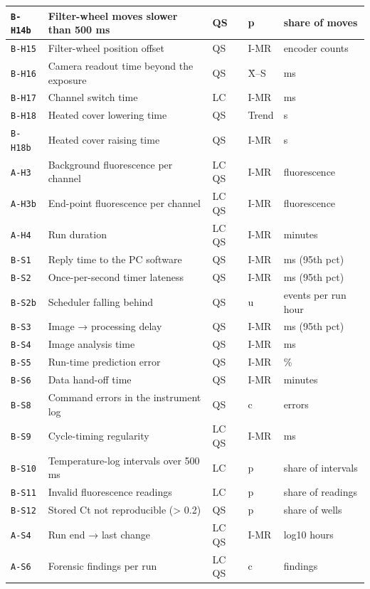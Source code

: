 {\begin{longtable}{@{}lllll@{}}
\texttt{B-H14b} & Filter-wheel moves slower than 500 ms & QS & p & share of moves \\\hline
\texttt{B-H15} & Filter-wheel position offset & QS & I-MR & encoder counts \\\hline
\texttt{B-H16} & Camera readout time beyond the exposure & QS & X̄–S & ms \\\hline
\texttt{B-H17} & Channel switch time & LC & I-MR & ms \\\hline
\texttt{B-H18} & Heated cover lowering time & QS & Trend & s \\\hline
\texttt{B-H18b} & Heated cover raising time & QS & I-MR & s \\\hline
\texttt{A-H3} & Background fluorescence per channel & LC QS & I-MR & fluorescence \\\hline
\texttt{A-H3b} & End-point fluorescence per channel & LC QS & I-MR & fluorescence \\\hline
\texttt{A-H4} & Run duration & LC QS & I-MR & minutes \\\hline
\texttt{B-S1} & Reply time to the PC software & QS & I-MR & ms (95th pct) \\\hline
\texttt{B-S2} & Once-per-second timer lateness & QS & I-MR & ms (95th pct) \\\hline
\texttt{B-S2b} & Scheduler falling behind & QS & u & events per run hour \\\hline
\texttt{B-S3} & Image → processing delay & QS & I-MR & ms (95th pct) \\\hline
\texttt{B-S4} & Image analysis time & QS & I-MR & ms \\\hline
\texttt{B-S5} & Run-time prediction error & QS & I-MR & \% \\\hline
\texttt{B-S6} & Data hand-off time & QS & I-MR & minutes \\\hline
\texttt{B-S8} & Command errors in the instrument log & QS & c & errors \\\hline
\texttt{B-S9} & Cycle-timing regularity & LC QS & I-MR & ms \\\hline
\texttt{B-S10} & Temperature-log intervals over 500 ms & LC & p & share of intervals \\\hline
\texttt{B-S11} & Invalid fluorescence readings & LC & p & share of readings \\\hline
\texttt{B-S12} & Stored Ct not reproducible (> 0.2) & QS & p & share of wells \\\hline
\texttt{A-S4} & Run end → last change & LC QS & I-MR & log10 hours \\\hline
\texttt{A-S6} & Forensic findings per run & LC QS & c & findings \\\hline

\end{longtable}}
